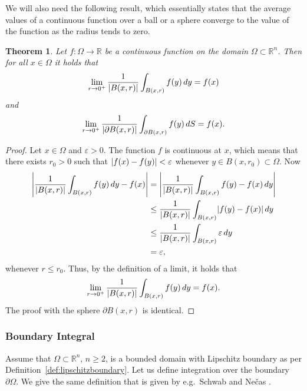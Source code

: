 \documentclass[english, 12pt, a4paper, sci, utf8, a-2b, online]{aaltothesis}
\theoremstyle{definition}
\theoremstyle{plain}
\newtheorem{theorem}{Theorem}[section]
\DeclarePairedDelimiter\abs{\lvert}{\rvert}
\newcommand*\diff{\mathop{}\!d}
\numberwithin{equation}{section}
\begin{document}
We will also need the following result, which essentially states that
the average values of a continuous function over a ball or a sphere
converge to the value of the function as the radius tends to zero.
\begin{theorem}
    \label{thm:lebesgue_differentiation_theorem}
    Let $f: \Omega \to \mathbb{R}$ be a continuous function
    on the domain $\Omega \subset \mathbb{R}^n$. Then for all $x \in \Omega$
    it holds that
    \begin{equation*}
        \lim_{r \to 0^+}
            \frac{1}{\abs{B(x,r)}}
                \int_{B(x,r)} f(y) \diff y = f(x)
    \end{equation*}
    and
    \begin{equation*}
        \lim_{r \to 0^+}
            \frac{1}{\abs{\partial B(x,r)}}
                \int_{\partial B(x,r)} f(y) \diff S = f(x).
    \end{equation*}
\end{theorem}
\begin{proof}
    Let $x \in \Omega$ and $\varepsilon > 0$.
    The function $f$ is continuous at $x$, which means that there exists
    $r_0 > 0$ such that $\abs{f(x)-f(y)} < \varepsilon$ whenever
    $y \in B(x,r_0) \subset \Omega$. Now
    \begin{align*}
        \abs*{\frac{1}{\abs{B(x,r)}} \int_{B(x,r)} f(y) \diff y - f(x)}
        &= \abs*{\frac{1}{\abs{B(x,r)}} \int_{B(x,r)} f(y) - f(x) \diff y} \\
        &\leq \frac{1}{\abs{B(x,r)}} \int_{B(x,r)} \abs{f(y) - f(x)} \diff y \\
        &\leq \frac{1}{\abs{B(x,r)}} \int_{B(x,r)} \varepsilon \diff y \\
        &= \varepsilon,
    \end{align*}
    whenever $r \leq r_0$. Thus, by the definition of a limit, it holds that
    \begin{equation*}
        \lim_{r \to 0^+}
            \frac{1}{\abs{B(x,r)}}
                \int_{B(x,r)} f(y) \diff y = f(x).
    \end{equation*}
    The proof with the sphere $\partial B(x,r)$ is identical.
\end{proof}

\subsubsection{Boundary Integral}
\label{subsubsec:boundaryintegral}

Assume that $\Omega \subset \mathbb{R}^n$, $n \geq 2$, is a bounded domain with
Lipschitz boundary as per Definition~\ref{def:lipschitzboundary}.
Let us define integration over the boundary $\partial \Omega$.
We give the same definition that is given by e.g.\
Schwab \cite{schwab1998} and Ne{\v c}as \cite{necas2011}.
\end{document}
